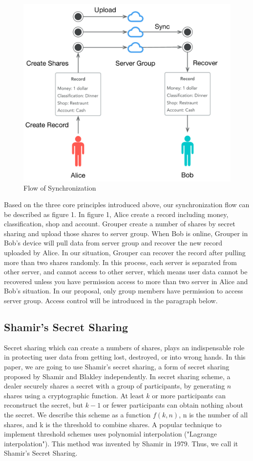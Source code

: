 \documentclass[twocolumn,10pt]{article}
\begin{document}
\begin{figure}[t]
\centering
\includegraphics[scale=0.4]{sync_flow}
\caption{Flow of Synchronization}
\end{figure}
Based on the three core principles introduced above, our synchronization flow can be described as figure 1. In figure 1, Alice create a record including money, classification, shop and account. Grouper create a number of shares by secret sharing and upload those shares to server group. When Bob is online, Grouper in Bob's device will pull data from server group and recover the new record uploaded by Alice. In our situation, Grouper can recover the record after pulling more than two shares randomly. In this process, each server is separated from other server, and cannot access to other server, which means user data cannot be recovered unless you have permission access to more than two server in Alice and Bob's situation. In our proposal, only group members have permission to access server group. Access control will be introduced in the paragraph below.


\subsection{Shamir's Secret Sharing}
Secret sharing which can create a numbers of shares, plays an indispensable role in protecting user data from getting lost, destroyed, or into wrong hands. In this paper, we are going to use Shamir's secret sharing, a form of secret sharing proposed by Shamir and Blakley independently. In secret sharing scheme, a dealer securely shares a secret with a group of participants, by generating $n$ shares using a cryptographic function\cite{smith2013layered}. At least $k$ or more participants can reconstruct the secret, but $k-1$ or fewer participants can obtain nothing about the secret\cite{pang2005new}. We describe this scheme as a function $f(k, n)$, n is the number of all shares, and k is the threshold to combine shares. A popular technique to implement threshold schemes uses polynomial interpolation ("Lagrange interpolation"). This method was invented by Shamir in 1979. Thus, we call it Shamir's Secret Sharing.
\end{document}
